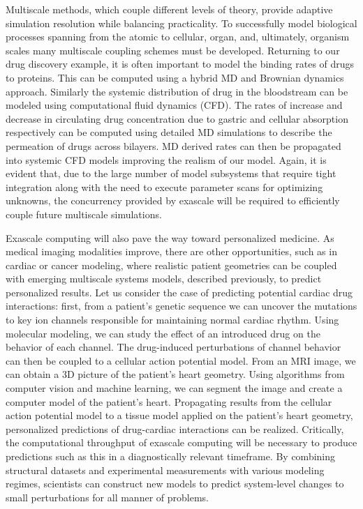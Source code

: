 \par Multiscale methods, which couple different levels of theory, provide adaptive simulation resolution while balancing practicality. To successfully model biological processes spanning from the atomic to cellular, organ, and, ultimately, organism scales many multiscale coupling schemes must be developed. Returning to our drug discovery example, it is often important to model the binding rates of drugs to proteins. This can be computed using a hybrid MD and Brownian dynamics approach\cite{Votapka2015,Votapka2017c}. Similarly the systemic distribution of drug in the bloodstream can be modeled using computational fluid dynamics (CFD). The rates of increase and decrease in circulating drug concentration due to gastric and cellular absorption respectively can be computed using detailed MD simulations to describe the permeation of drugs across bilayers. MD derived rates can then be propagated into systemic CFD models improving the realism of our model. Again, it is evident that, due to the large number of model subsystems that require tight integration along with the need to execute parameter scans for optimizing unknowns, the concurrency provided by exascale will be required to efficiently couple future multiscale simulations.
\par Exascale computing will also pave the way toward personalized medicine. As medical imaging modalities improve, there are other opportunities, such as in cardiac\cite{Kayvanpour2015,Winslow2012} or cancer\cite{Deisboeck2011} modeling, where realistic patient geometries can be coupled with emerging multiscale systems models, described previously, to predict personalized results\cite{Winslow2012}. Let us consider the case of predicting potential cardiac drug interactions: first, from a patient's genetic sequence we can uncover the mutations to key ion channels responsible for maintaining normal cardiac rhythm. Using molecular modeling, we can study the effect of an introduced drug on the behavior of each channel. The drug-induced perturbations of channel behavior can then be coupled to a cellular action potential model. From an MRI image, we can obtain a 3D picture of the patient's heart geometry. Using algorithms from computer vision and machine learning, we can segment the image and create a computer model of the patient's heart. Propagating results from the cellular action potential model to a tissue model applied on the patient's heart geometry, personalized predictions of drug-cardiac interactions can be realized. Critically, the computational throughput of exascale computing will be necessary to produce predictions such as this in a diagnostically relevant timeframe. By combining structural datasets and experimental measurements with various modeling regimes, scientists can construct new models to predict system-level changes to small perturbations for all manner of problems.

